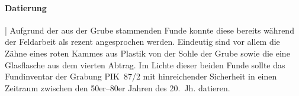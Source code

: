 \paragraph{Datierung}\hspace{-.5em}|\hspace{.5em}%
Aufgrund der aus der Grube stammenden Funde konnte diese bereits während der Feldarbeit als rezent angesprochen werden. Eindeutig sind vor allem die Zähne eines roten Kammes aus Plastik von der Sohle der Grube sowie die eine Glasflasche aus dem vierten Abtrag. Im Lichte dieser beiden Funde sollte das Fundinventar der Grabung PIK~87/2 mit hinreichender Sicherheit in einen Zeitraum zwischen den 50er--80er Jahren des 20.~Jh. datieren.